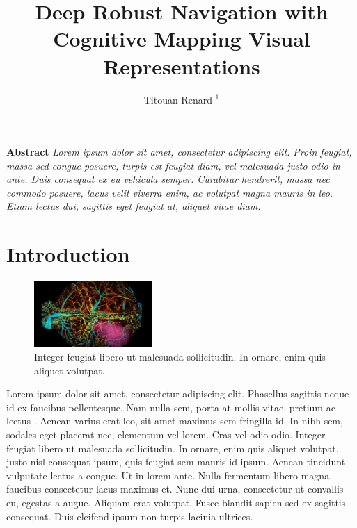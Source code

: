 \documentclass{two-col-epfl}
\begin{document}

\title{Deep Robust Navigation with Cognitive Mapping Visual Representations}

\author{Titouan Renard $^1$}

\address{}
\maketitle








\textbf{Abstract}
\textit{Lorem ipsum dolor sit amet, consectetur adipiscing elit. Proin feugiat, massa sed congue posuere, turpis est feugiat diam, vel malesuada justo odio in ante. Duis consequat ex eu vehicula semper. Curabitur hendrerit, massa nec commodo posuere, lacus velit viverra enim, ac volutpat magna mauris in leo. Etiam lectus dui, sagittis eget feugiat at, aliquet vitae diam.}

\section{Introduction}

\begin{figure}[tbph]
  \centering
  \includegraphics[width=0.4\textwidth]{figures/example_figure.jpeg}
  \caption{Integer feugiat libero ut malesuada sollicitudin. In ornare, enim quis aliquet volutpat.} 
\end{figure}


Lorem ipsum dolor sit amet, consectetur adipiscing elit. Phasellus sagittis neque id ex faucibus pellentesque. Nam nulla sem, porta at mollis vitae, pretium ac lectus \cite{chaplot2020learning}. Aenean varius erat leo, sit amet maximus sem fringilla id. In nibh sem, sodales eget placerat nec, elementum vel lorem. Cras vel odio odio. Integer feugiat libero ut malesuada sollicitudin. In ornare, enim quis aliquet volutpat, justo nisl consequat ipsum, quis feugiat sem mauris id ipsum. Aenean tincidunt vulputate lectus a congue. Ut in lorem ante. Nulla fermentum libero magna, faucibus consectetur lacus maximus et. Nunc dui urna, consectetur ut convallis eu, egestas a augue. Aliquam erat volutpat. Fusce blandit sapien sed ex sagittis consequat. Duis eleifend ipsum non turpis lacinia ultrices.
\end{document}
